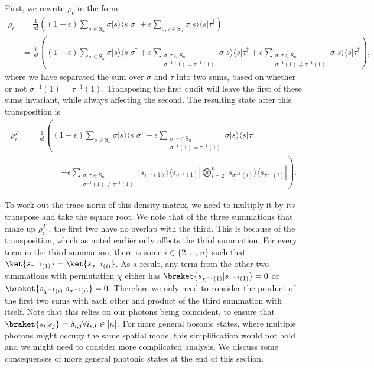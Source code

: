 First, we rewrite $\rho_\epsilon$ in the form
\begin{align}
\rho_\epsilon
 &= \frac{1}{n!}\left((1-\epsilon)\sum_{\sigma\in \textrm{S}_n}\sigma|s\rangle\langle s|\sigma^\dagger + \epsilon\sum_{\sigma,\tau \in \textrm{S}_n}\sigma|s\rangle\langle s|\tau^\dagger\right)\\
 &= \frac{1}{n!}\left((1-\epsilon)\sum_{\sigma\in \textrm{S}_n}\sigma|s\rangle\langle s|\sigma^\dagger + \epsilon\sum_{\substack{\sigma,\tau \in \textrm{S}_n\\\sigma^{-1}(1) = \tau^{-1}(1)}}\sigma|s\rangle\langle s|\tau^\dagger + \epsilon\sum_{\substack{\sigma,\tau \in \textrm{S}_n\\\sigma^{-1}(1) \neq \tau^{-1}(1)}}\sigma|s\rangle\langle s|\tau^\dagger\right) ,
\end{align}
where we have separated the sum over $\sigma$ and $\tau$ into two sums, based on whether or not $\sigma^{-1}(1) = \tau^{-1}(1)$. 
Transposing the first qudit will leave the first of these sums invariant, while always affecting the second. 
The resulting state after this transposition is
\begin{align}
\rho_{\epsilon}^{T_1}&=
\frac{1}{n!} \left((1-\epsilon)\sum_{\sigma\in \textrm{S}_n}\sigma|s\rangle\langle s|\sigma^\dagger + \epsilon\sum_{\substack{\sigma,\tau \in \textrm{S}_n\\\sigma^{-1}(1) = \tau^{-1}(1)}}\sigma|s\rangle\langle s|\tau^\dagger\right.\nonumber\\
&\quad\quad\quad\quad\left.+ \epsilon\sum_{\substack{\sigma,\tau \in \textrm{S}_n\\\sigma^{-1}(1) \neq \tau^{-1}(1)}}|s_{\tau^{-1}(1)}\rangle\langle s_{\sigma^{-1}(1)}|\bigotimes_{i=2}^n|s_{\sigma^{-1}(i)}\rangle\langle s_{\tau^{-1}(i)}|\right).
\end{align}

To work out the trace norm of this density matrix, we need to multiply it by its transpose and take the square root. We note that of the three summations that make up $\rho_{\epsilon}^{T_1}$, the first two have no overlap with the third. This is because of the transposition, which as noted earlier only affects the third summation. For every term in the third summation, there is some $i \in \{2,\dots,n\}$ such that $\ket{s_{\tau^{-1}(1)}} = \ket{s_{\sigma^{-1}(i)}}$. As a result, any term from the other two summations with permutation $\chi$ either has $\braket{s_{\chi^{-1}(1)}|s_{\tau^{-1}(1)}}=0$ or $\braket{s_{\chi^{-1}(i)}|s_{\sigma^{-1}(i)}}=0$. Therefore we only need to consider the product of the first two sums with each other and product of the third summation with itself. Note that this relies on our photons being coincident, to ensure that $\braket{s_i|s_j}=\delta_{i,j}\forall i,j \in [n]$. For more general bosonic states, where multiple photons might occupy the same spatial mode, this simplification would not hold and we might need to consider more complicated analysis. We discuss some consequences of more general photonic states at the end of this section.

